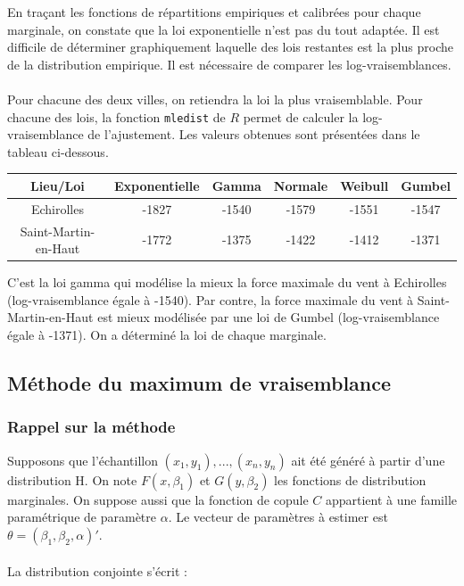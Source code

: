 En traçant les fonctions de répartitions empiriques et calibrées pour chaque marginale, on constate que la loi exponentielle n'est pas du tout adaptée. Il est difficile de déterminer graphiquement laquelle des lois restantes est la plus proche de la distribution empirique. Il est nécessaire de comparer les log-vraisemblances.
\\ \\
Pour chacune des deux villes, on retiendra la loi la plus vraisemblable. Pour chacune des lois, la fonction \lstinline!mledist! de $R$ permet de calculer la log-vraisemblance de l'ajustement. Les valeurs obtenues sont présentées dans le tableau ci-dessous. 
\begin{center}
\begin{tabular}{|c|c|c|c|c|c|}
\hline 
Lieu/Loi & Exponentielle & Gamma & Normale & Weibull & Gumbel \\
\hline
Echirolles & -1827 & -1540 & -1579 & -1551 & -1547 \\
\hline
Saint-Martin-en-Haut & -1772  & -1375 & -1422 & -1412 & -1371 \\
\hline
\end{tabular}
\end{center}

\vspace{0.4cm}
C'est la loi gamma qui modélise la mieux la force maximale du vent à Echirolles (log-vraisemblance égale à -1540). Par contre, la force maximale du vent à Saint-Martin-en-Haut est mieux modélisée par une loi de Gumbel (log-vraisemblance égale à -1371). On a déterminé la loi de chaque marginale.

\subsection{Méthode du maximum de vraisemblance}

\subsubsection{Rappel sur la méthode}

Supposons que l'échantillon $(x_1,y_1),...,(x_n,y_n)$ ait été généré à partir d'une distribution H. On note $F(x,\beta_1)$ et $G(y,\beta_2)$ les fonctions de distribution marginales. On suppose aussi que la fonction de copule $C$ appartient à une famille paramétrique de paramètre $\alpha$. Le vecteur de paramètres à estimer est $\theta = (\beta_1,\beta_2,\alpha)'$. 
\\ \\
La distribution conjointe s'écrit :

